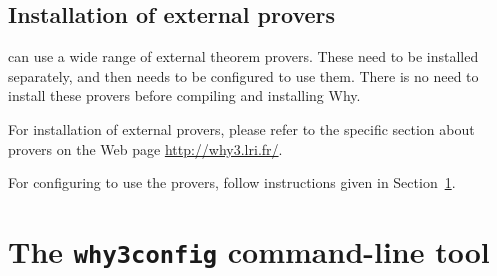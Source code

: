 \subsection{Installation of external provers}
\label{provers}

\why can use a wide range of external theorem provers. These need to
be installed separately, and then \why needs to be configured to use
them. There is no need to install these provers before compiling and
installing Why.

For installation of external provers, please refer to the specific
section about provers on the Web page \url{http://why3.lri.fr/}.

For configuring \why to use the provers, follow instructions given in
Section~\ref{sec:why3config}.



\section{The \texttt{why3config} command-line tool}
\label{sec:why3config}

